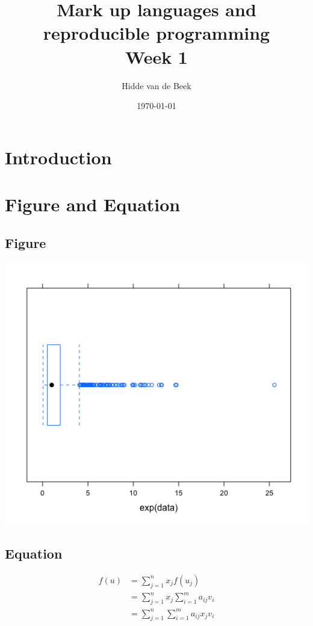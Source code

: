 \documentclass[10pt, a4paper, titlepage]{article}
\title{Mark up languages and reproducible programming\\ \small Week 1}
\author{Hidde van de Beek}
\date{\today}
\begin{document}
\maketitle
\newpage

\section*{Introduction}

\section{Figure and Equation}
\subsection{Figure}

\includegraphics[width=\textwidth]{4e9e7775-4e77-45af-aa79-aeac92f7c1ee.png}

\subsection{Equation}
\begin{align}
    f(u) & =\sum_{j=1}^{n} x_jf(u_j)\\
         & =\sum_{j=1}^{n} x_j \sum_{i=1}^{m} a_{ij}v_i\\
         & =\sum_{j=1}^{n} \sum_{i=1}^{m} a_{ij}x_jv_i
\end{align}

\newpage
\end{document}
